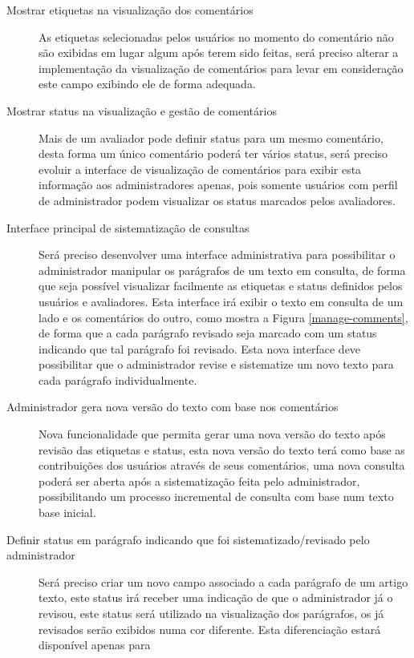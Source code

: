 \documentclass[12pt]{article}
\begin{document}
\begin{description}
  \item[Mostrar etiquetas na visualização dos comentários]{As etiquetas
    selecionadas pelos usuários no momento do comentário não são exibidas em
    lugar algum após terem sido feitas, será preciso alterar a implementação da
    visualização de comentários para levar em consideração este campo exibindo
    ele de forma adequada.}
  \item[Mostrar status na visualização e gestão de comentários]{Mais de um
    avaliador pode definir status para um mesmo comentário, desta forma um
    único comentário poderá ter vários status, será preciso evoluir a interface
    de visualização de comentários para exibir esta informação
    aos administradores apenas, pois somente usuários com perfil de administrador
    podem visualizar os status marcados pelos avaliadores.}
  \item[Interface principal de sistematização de consultas]{Será preciso
    desenvolver uma interface administrativa para possibilitar o
    administrador manipular os parágrafos de um texto em consulta, de forma que
    seja possível visualizar facilmente as etiquetas e status definidos pelos
    usuários e avaliadores. Esta interface irá exibir o texto em consulta de
    um lado e os comentários do outro, como mostra a Figura
    \ref{manage-comments}, de forma que a cada parágrafo revisado seja marcado
    com um status indicando que tal parágrafo foi revisado. Esta nova
    interface deve possibilitar que o administrador revise e sistematize um novo
    texto para cada parágrafo individualmente.}
  \item[Administrador gera nova versão do texto com base nos comentários]{Nova
    funcionalidade que permita gerar uma nova versão do texto após revisão das
    etiquetas e status, esta nova versão do texto terá como base as
    contribuições dos usuários através de seus comentários, uma nova consulta
    poderá ser aberta após a sistematização feita pelo administrador,
    possibilitando um processo incremental de consulta com base num texto base
    inicial.}
  \item[Definir status em parágrafo indicando que foi
    sistematizado/revisado pelo administrador]{Será preciso criar um novo
    campo associado a cada parágrafo de um artigo texto, este status irá
    receber uma indicação de que o administrador já o revisou, este status será
    utilizado na visualização dos parágrafos, os já revisados serão exibidos numa
    cor diferente. Esta diferenciação estará disponível apenas para
}
\end{description}
\end{document}
